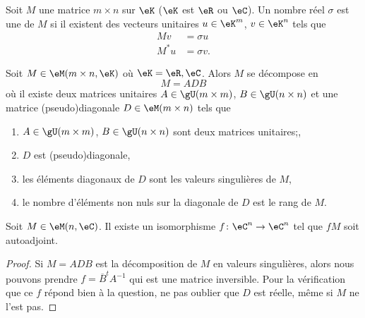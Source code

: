 \begin{definition}
    Soit \( M\) une matrice \( m\times n\) sur \( \eK\) (\( \eK\) est \( \eR\) ou \( \eC\)). Un nombre réel \( \sigma\) est une  de \( M\) si il existent des vecteurs unitaires \( u\in \eK^m\), \( v\in \eK^n\) tels que
    \begin{subequations}
        \begin{align}
            Mv&=\sigma u\\
            M^*u&=\sigma v.
        \end{align}
    \end{subequations}
\end{definition}

\begin{theorem}
    Soit \( M\in \eM(m\times n,\eK)\) où \( \eK=\eR,\eC\). Alors \( M\) se décompose en
    \begin{equation}
        M=ADB
    \end{equation}
    où
    il existe deux matrices unitaires \( A\in \gU(m\times m)\), \( B\in \gU(n\times n)\) et une matrice (pseudo)diagonale \( D\in \eM(m\times n)\) tels que
    \begin{enumerate}
        \item 
            \( A\in\gU(m\times m)\), \( B\in\gU(n\times n)\) sont deux matrices unitaires;,
        \item
            \( D\) est (pseudo)diagonale,
        \item
            les éléments diagonaux de \( D\) sont les valeurs singulières de \( M\),
        \item
            le nombre d'éléments non nuls sur la diagonale de \( D\) est le rang de \( M\).
    \end{enumerate}
\end{theorem}

\begin{corollary}
    Soit \( M\in \eM(n,\eC)\). Il existe un isomorphisme \( f\colon \eC^n\to \eC^n\) tel que \( fM\) soit autoadjoint.
\end{corollary}

\begin{proof}
    Si \( M=ADB\) est la décomposition de \( M\) en valeurs singulières, alors nous pouvons prendre \( f=\overline{ B }^tA^{-1}\) qui est une matrice inversible. Pour la vérification que ce \( f\) répond bien à la question, ne pas oublier que \( D\) est réelle, même si \( M\) ne l'est pas.
\end{proof}

